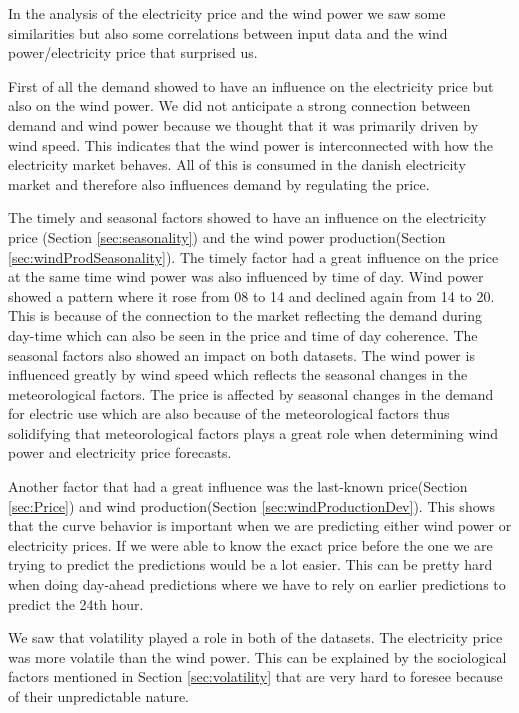 In the analysis of the electricity price and the wind power we saw some similarities but also some correlations between input data and the wind power/electricity price that surprised us.

First of all the demand showed to have an influence on the electricity price but also on the wind power. We did not anticipate a strong connection between demand and wind power because we thought that it was primarily driven by wind speed. This indicates that the wind power is interconnected with how the electricity market behaves. All of this  is consumed in the danish electricity market and therefore also influences demand by regulating the price.

The timely and seasonal factors showed to have an influence on the electricity price (Section \ref{sec:seasonality}) and the wind power production(Section \ref{sec:windProdSeasonality}). The timely factor had a great influence on the price at the same time wind power was also influenced by time of day. Wind power showed a pattern where it rose from 08 to 14 and declined again from 14 to 20. This is because of the connection to the market reflecting the demand during day-time which can also be seen in the price and time of day coherence. The seasonal factors also showed an impact on both datasets. The wind power is influenced greatly by wind speed which reflects the seasonal changes in the meteorological factors. The price is affected by seasonal changes in the demand for electric use which are also because of the meteorological factors thus solidifying that meteorological factors plays a great role when determining wind power and electricity price forecasts.

Another factor that had a great influence was the last-known price(Section \ref{sec:Price}) and wind production(Section \ref{sec:windProductionDev}). This shows that the curve behavior is important when we are predicting either wind power or electricity prices. If we were able to know the exact price before the one we are trying to predict the predictions would be a lot easier. This can be pretty hard when doing day-ahead predictions where we have to rely on earlier predictions to predict the 24th hour.

We saw that volatility played a role in both of the datasets. The electricity price was more volatile than the wind power. This can be explained by the sociological factors mentioned in Section \ref{sec:volatility} that are very hard to foresee because of their unpredictable nature.

